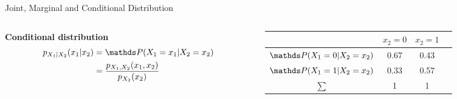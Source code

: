 \documentclass[10pt,compress,t,notes=noshow, xcolor=table]{beamer}
\begin{document}
\begin{frame}{Joint, Marginal and Conditional Distribution}
    \medskip\pause
    
\begin{columns}[c, totalwidth=\textwidth]
    \begin{column}{0.5\textwidth}
    \textbf{Conditional distribution}
        \begin{align*}
            p_{X_1|X_2}(x_1 | x_2) &= \P(X_1=x_1| X_2 = x_2) \\&= \frac{p_{X_1, X_2}(x_1,x_2)}{p_{X_2}(x_2)}
        \end{align*}
 
    \end{column}
    \begin{column}{0.5\textwidth}
    \begin{table}
    \scriptsize
        \begin{tabular}{|c|c|c|c|}
            \hline 
             & $x_2 = 0$ & $x_2 = 1$ \\
            \hline
            $\P(X_1 = 0|X_2 =x_2)$ & \cellcolor{gray} 0.67 & \cellcolor{gray}0.43   \\
            \hline
            $\P(X_1 = 1|X_2 =x_2)$ & \cellcolor{gray} 0.33 & \cellcolor{gray}0.57   \\
            \hline
            $\sum$ & 1 & 1  \\
            \hline
        \end{tabular}
    \end{table}
    \end{column}
    \end{columns} 
\end{frame}
\end{document}
